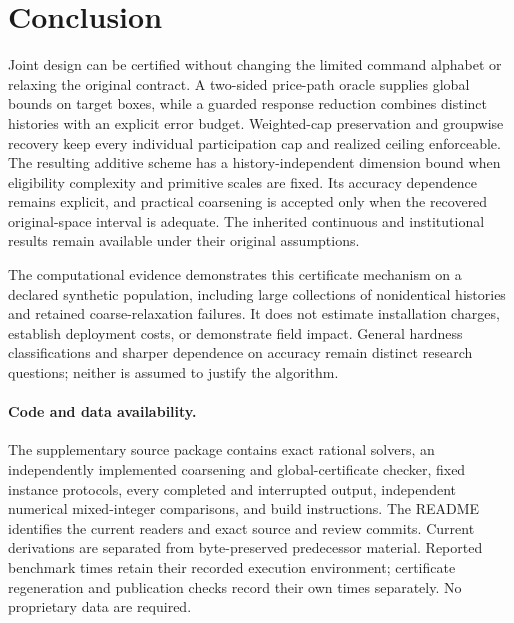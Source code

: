 \section{Conclusion}
Joint design can be certified without changing the limited command alphabet or relaxing the original contract. A two-sided price-path oracle supplies global bounds on target boxes, while a guarded response reduction combines distinct histories with an explicit error budget. Weighted-cap preservation and groupwise recovery keep every individual participation cap and realized ceiling enforceable. The resulting additive scheme has a history-independent dimension bound when eligibility complexity and primitive scales are fixed. Its accuracy dependence remains explicit, and practical coarsening is accepted only when the recovered original-space interval is adequate. The inherited continuous and institutional results remain available under their original assumptions.

The computational evidence demonstrates this certificate mechanism on a declared synthetic population, including large collections of nonidentical histories and retained coarse-relaxation failures. It does not estimate installation charges, establish deployment costs, or demonstrate field impact. General hardness classifications and sharper dependence on accuracy remain distinct research questions; neither is assumed to justify the algorithm.

\paragraph{Code and data availability.}
The supplementary source package contains exact rational solvers, an independently implemented coarsening and global-certificate checker, fixed instance protocols, every completed and interrupted output, independent numerical mixed-integer comparisons, and build instructions. The README identifies the current readers and exact source and review commits. Current derivations are separated from byte-preserved predecessor material. Reported benchmark times retain their recorded execution environment; certificate regeneration and publication checks record their own times separately. No proprietary data are required.

